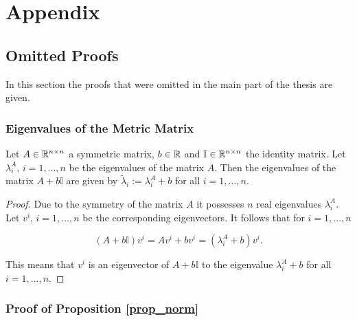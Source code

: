 \appendix
\section{Appendix}

\subsection{Omitted Proofs}

In this section the proofs that were omitted in the main part of the thesis are given.

\subsubsection{Eigenvalues of the Metric Matrix}
\label{proof_eigval}

\begin{proposition}
		Let \(A \in \mathbb{R}^{n\times n}\) a symmetric matrix, \(b \in \mathbb{R}\) and \(\mathbb{I} \in \mathbb{R}^{n\times n}\) the identity matrix.
		Let \(\lambda^A_i\), \(i = 1,...,n\) be the eigenvalues of the matrix \(A\). Then the eigenvalues of the matrix \(A+b\mathbb{I}\) are given by \(\tilde{\lambda}_i := \lambda^A_i + b\) for all \(i = 1,...,n\).
\end{proposition}

\begin{proof}
	Due to the symmetry of the matrix \(A\) it possesses  \(n\) real eigenvalues \(\lambda^A_i\).
	Let \(v^i\), \(i = 1,...,n\) be the corresponding eigenvectors. It follows that for \(i = 1,...,n\)
	
	\[ (A+b\mathbb{I})v^i = Av^i+bv^i = (\lambda_i^A + b)v^i. \]
	
	This means that \(v^i\) is an eigenvector of \(A+b\mathbb{I}\) to the eigenvalue \(\lambda_i^A + b\) for all \(i = 1,...,n\).
\end{proof}

\subsubsection{Proof of Proposition \ref{prop_norm}}
\label{proof_norm}

